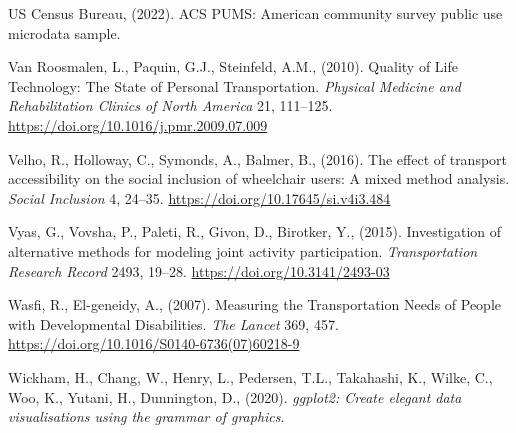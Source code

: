 \documentclass[3p, authoryear, review]{elsarticle} %
\newlength{\cslhangindent}
\newenvironment{CSLReferences}[2] %
 {%
  \setlength{\parindent}{0pt}
  \ifodd #1 \everypar{\setlength{\hangindent}{\cslhangindent}}\ignorespaces\fi
  \ifnum #2 > 0
  \setlength{\parskip}{#2\baselineskip}
  \fi
 }%
 {}
\begin{document}
\begin{CSLReferences}{1}{0}
\leavevmode{}%
US Census Bureau, (2022). ACS PUMS: American community survey public use microdata sample.

\leavevmode{}%
Van Roosmalen, L., Paquin, G.J., Steinfeld, A.M., (2010). {Quality of Life Technology: The State of Personal Transportation}. \emph{Physical Medicine and Rehabilitation Clinics of North America} 21, 111--125. \url{https://doi.org/10.1016/j.pmr.2009.07.009}

\leavevmode{}%
Velho, R., Holloway, C., Symonds, A., Balmer, B., (2016). {The effect of transport accessibility on the social inclusion of wheelchair users: A mixed method analysis}. \emph{Social Inclusion} 4, 24--35. \url{https://doi.org/10.17645/si.v4i3.484}

\leavevmode{}%
Vyas, G., Vovsha, P., Paleti, R., Givon, D., Birotker, Y., (2015). Investigation of alternative methods for modeling joint activity participation. \emph{Transportation Research Record} 2493, 19--28. \url{https://doi.org/10.3141/2493-03}

\leavevmode{}%
Wasfi, R., El-geneidy, A., (2007). {Measuring the Transportation Needs of People with Developmental Disabilities}. \emph{The Lancet} 369, 457. \url{https://doi.org/10.1016/S0140-6736(07)60218-9}

\leavevmode{}%
Wickham, H., Chang, W., Henry, L., Pedersen, T.L., Takahashi, K., Wilke, C., Woo, K., Yutani, H., Dunnington, D., (2020). \emph{ggplot2: Create elegant data visualisations using the grammar of graphics}.

\end{CSLReferences}
\end{document}
